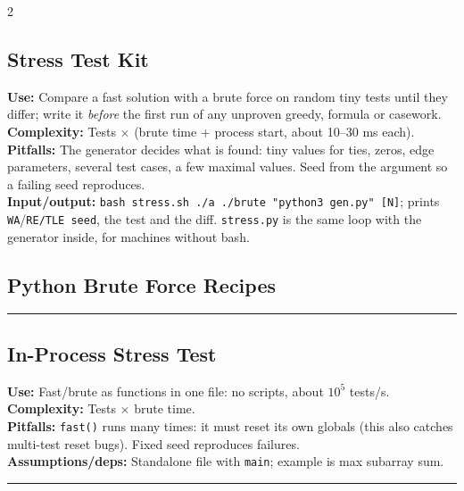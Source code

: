 \documentclass[a4paper,landscape]{article}
\newcommand{\alg}[6]{
\par\noindent\rule{\linewidth}{0.4pt}\par
\subsection{#1}
\textbf{Use:} #2\\
\textbf{Complexity:} #3\\
\textbf{Pitfalls:} #4\\
\textbf{Assumptions/deps:} #5

}
\begin{document}
\begin{multicols}{2}
\subsection{Stress Test Kit}
\textbf{Use:} Compare a fast solution with a brute force on random tiny tests until they differ; write it \emph{before} the first run of any unproven greedy, formula or casework.\\
\textbf{Complexity:} Tests $\times$ (brute time + process start, about 10--30 ms each).\\
\textbf{Pitfalls:} The generator decides what is found: tiny values for ties, zeros, edge parameters, several test cases, a few maximal values. Seed from the argument so a failing seed reproduces.\\
\textbf{Input/output:} \texttt{bash stress.sh ./a ./brute "python3 gen.py" [N]}; prints \texttt{WA}/\texttt{RE/TLE seed}, the test and the diff. \texttt{stress.py} is the same loop with the generator inside, for machines without bash.



\subsection{Python Brute Force Recipes}

\alg{In-Process Stress Test}{Fast/brute as functions in one file: no scripts, about $10^5$ tests/s.}{Tests $\times$ brute time.}{\texttt{fast()} runs many times: it must reset its own globals (this also catches multi-test reset bugs). Fixed seed reproduces failures.}{Standalone file with \texttt{main}; example is max subarray sum.}{sections/misc/stress.cpp}
\par\noindent\rule{\linewidth}{0.4pt}\par

\end{multicols}
\end{document}
